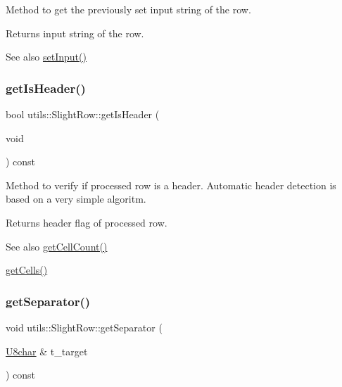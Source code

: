 Method to get the previously set input string of the row. \begin{DoxyReturn}{Returns}
input string of the row. 
\end{DoxyReturn}
\begin{DoxySeeAlso}{See also}
\hyperlink{classutils_1_1SlightRow_a6642e240662b1d078c9103f867f0adf9}{set\+Input()} 
\end{DoxySeeAlso}
\mbox{\label{classutils_1_1SlightRow_a702f97c32ea40303cd83a540404a6eca}} 
\subsubsection{\texorpdfstring{get\+Is\+Header()}{getIsHeader()}}
{\footnotesize\ttfamily bool utils\+::\+Slight\+Row\+::get\+Is\+Header (\begin{DoxyParamCaption}\item[{void}]{ }\end{DoxyParamCaption}) const}

Method to verify if processed row is a header. Automatic header detection is based on a very simple algoritm. \begin{DoxyReturn}{Returns}
header flag of processed row. 
\end{DoxyReturn}
\begin{DoxySeeAlso}{See also}
\hyperlink{classutils_1_1SlightRow_af7df52464ce8151d7c3c429d0a796c7f}{get\+Cell\+Count()} 

\hyperlink{classutils_1_1SlightRow_ab06e2a27035951ff80edf834b430c829}{get\+Cells()} 
\end{DoxySeeAlso}
\mbox{\label{classutils_1_1SlightRow_a413f5dbd5873c2226c62907e854b7328}} 
\subsubsection{\texorpdfstring{get\+Separator()}{getSeparator()}}
{\footnotesize\ttfamily void utils\+::\+Slight\+Row\+::get\+Separator (\begin{DoxyParamCaption}\item[{\hyperlink{classutils_1_1U8char}{U8char} \&}]{t\+\_\+target }\end{DoxyParamCaption}) const}

